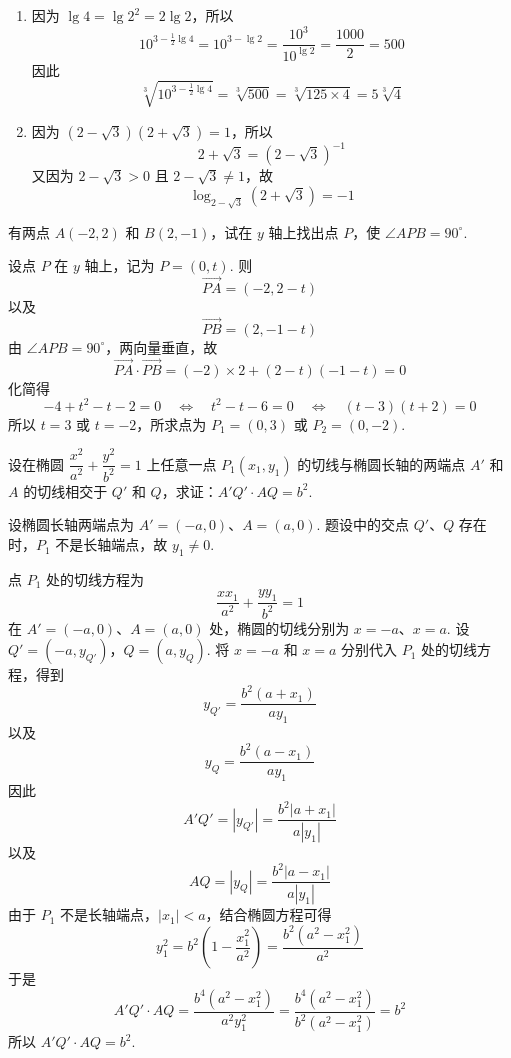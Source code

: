 \begin{solution}
\begin{enumerate}
    \item 因为 \(\lg 4=\lg 2^2=2\lg 2\)，所以
    \[
    10^{3-\frac12\lg4}=10^{3-\lg2}=\frac{10^3}{10^{\lg2}}=\frac{1000}{2}=500
    \]
    因此
    \[
    \sqrt[3]{10^{3-\frac12\lg4}}=\sqrt[3]{500}=\sqrt[3]{125\times4}=5\sqrt[3]{4}
    \]

    \item 因为 \(\left(2-\sqrt{3}\right)\left(2+\sqrt{3}\right)=1\)，所以
    \[
    2+\sqrt{3}=\left(2-\sqrt{3}\right)^{-1}
    \]
    又因为 \(2-\sqrt{3}>0\) 且 \(2-\sqrt{3}\ne1\)，故
    \[
    \log_{2-\sqrt{3}}\left(2+\sqrt{3}\right)=-1
    \]
\end{enumerate}
\end{solution}

\begin{problem}
有两点 \(A\left(-2,2\right)\) 和 \(B\left(2,-1\right)\)，试在 \(y\) 轴上找出点 \(P\)，使 \(\angle APB=90^\circ\).
\end{problem}

\begin{solution}
设点 \(P\) 在 \(y\) 轴上，记为 \(P=(0,t)\). 则
\[
\overrightarrow{PA}=(-2,2-t)
\]
以及
\[
\overrightarrow{PB}=(2,-1-t)
\]
由 \(\angle APB=90^\circ\)，两向量垂直，故
\[
\overrightarrow{PA}\cdot\overrightarrow{PB}=(-2)\times2+(2-t)(-1-t)=0
\]
化简得
\[
-4+t^2-t-2=0
\quad\Longleftrightarrow\quad
t^2-t-6=0
\quad\Longleftrightarrow\quad
(t-3)(t+2)=0
\]
所以 \(t=3\) 或 \(t=-2\)，所求点为 \(P_1=(0,3)\) 或 \(P_2=(0,-2)\).
\end{solution}

\begin{problem}
设在椭圆 \(\dfrac{x^2}{a^2}+\dfrac{y^2}{b^2}=1\) 上任意一点 \(P_1\left(x_1,y_1\right)\) 的切线与椭圆长轴的两端点 \(A'\) 和 \(A\) 的切线相交于 \(Q'\) 和 \(Q\)，求证：\(A'Q'\cdot AQ=b^2\).
\end{problem}

\begin{solution}
设椭圆长轴两端点为 \(A'=(-a,0)\)、\(A=(a,0)\). 题设中的交点 \(Q'\)、\(Q\) 存在时，\(P_1\) 不是长轴端点，故 \(y_1\ne0\).

点 \(P_1\) 处的切线方程为
\[
\frac{xx_1}{a^2}+\frac{yy_1}{b^2}=1
\]
在 \(A'=(-a,0)\)、\(A=(a,0)\) 处，椭圆的切线分别为 \(x=-a\)、\(x=a\). 设
\(Q'=\left(-a,y_{Q'}\right)\)，\(Q=\left(a,y_Q\right)\).
将 \(x=-a\) 和 \(x=a\) 分别代入 \(P_1\) 处的切线方程，得到
\[
y_{Q'}=\frac{b^2(a+x_1)}{ay_1}
\]
以及
\[
y_Q=\frac{b^2(a-x_1)}{ay_1}
\]
因此
\[
A'Q'=|y_{Q'}|=\frac{b^2|a+x_1|}{a|y_1|}
\]
以及
\[
AQ=|y_Q|=\frac{b^2|a-x_1|}{a|y_1|}
\]
由于 \(P_1\) 不是长轴端点，\(|x_1|<a\)，结合椭圆方程可得
\[
y_1^2=b^2\left(1-\frac{x_1^2}{a^2}\right)=\frac{b^2(a^2-x_1^2)}{a^2}
\]
于是
\[
A'Q'\cdot AQ
=\frac{b^4(a^2-x_1^2)}{a^2y_1^2}
=\frac{b^4(a^2-x_1^2)}{b^2(a^2-x_1^2)}=b^2
\]
所以 \(A'Q'\cdot AQ=b^2\).
\end{solution}
